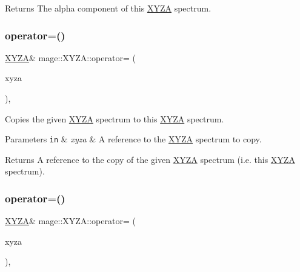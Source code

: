 \begin{DoxyReturn}{Returns}
The alpha component of this \mbox{\hyperlink{structmage_1_1_x_y_z_a}{X\+Y\+ZA}} spectrum. 
\end{DoxyReturn}
\mbox{\label{structmage_1_1_x_y_z_a_a203b9033f20f1d47d654e3bba2e2a62f}} 
\subsubsection{\texorpdfstring{operator=()}{operator=()}\hspace{0.1cm}{\footnotesize\ttfamily [1/2]}}
{\footnotesize\ttfamily \mbox{\hyperlink{structmage_1_1_x_y_z_a}{X\+Y\+ZA}}\& mage\+::\+X\+Y\+Z\+A\+::operator= (\begin{DoxyParamCaption}\item[{const \mbox{\hyperlink{structmage_1_1_x_y_z_a}{X\+Y\+ZA}} \&}]{xyza }\end{DoxyParamCaption})\hspace{0.3cm}{\ttfamily [default]}, {\ttfamily [noexcept]}}

Copies the given \mbox{\hyperlink{structmage_1_1_x_y_z_a}{X\+Y\+ZA}} spectrum to this \mbox{\hyperlink{structmage_1_1_x_y_z_a}{X\+Y\+ZA}} spectrum.


\begin{DoxyParams}[1]{Parameters}
\mbox{\tt in}  & {\em xyza} & A reference to the \mbox{\hyperlink{structmage_1_1_x_y_z_a}{X\+Y\+ZA}} spectrum to copy. \\
\hline
\end{DoxyParams}
\begin{DoxyReturn}{Returns}
A reference to the copy of the given \mbox{\hyperlink{structmage_1_1_x_y_z_a}{X\+Y\+ZA}} spectrum (i.\+e. this \mbox{\hyperlink{structmage_1_1_x_y_z_a}{X\+Y\+ZA}} spectrum). 
\end{DoxyReturn}
\mbox{\label{structmage_1_1_x_y_z_a_a54e3320e55516c1c0db38865a0036b47}} 
\subsubsection{\texorpdfstring{operator=()}{operator=()}\hspace{0.1cm}{\footnotesize\ttfamily [2/2]}}
{\footnotesize\ttfamily \mbox{\hyperlink{structmage_1_1_x_y_z_a}{X\+Y\+ZA}}\& mage\+::\+X\+Y\+Z\+A\+::operator= (\begin{DoxyParamCaption}\item[{\mbox{\hyperlink{structmage_1_1_x_y_z_a}{X\+Y\+ZA}} \&\&}]{xyza }\end{DoxyParamCaption})\hspace{0.3cm}{\ttfamily [default]}, {\ttfamily [noexcept]}}


